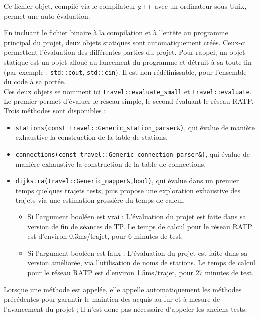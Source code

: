 \documentclass[9pts]{article}
\begin{document}
Ce fichier objet, compilé via le compilateur g++ avec un ordinateur sous Unix, permet une auto-évaluation.

En incluant le fichier binaire à la compilation et à l'entête au programme principal du projet, deux objets statiques sont automatiquement créés. Ceux-ci permettent l'évaluation des différentes parties du projet.
Pour rappel, un objet statique est un objet alloué au lancement du programme et détruit à sa toute fin (par exemple : \texttt{std::cout}, \texttt{std::cin}). Il est non rédéfinissable, pour l'ensemble du code à sa portée.\\

Ces deux objets se nomment ici \texttt{travel::evaluate\_small} et \texttt{travel::evaluate}. Le premier permet d'évaluer le réseau simple, le second évaluant le réseau RATP.\\

Trois méthodes sont disponibles :
\begin{itemize}
  \item \texttt{stations(const travel::Generic\_station\_parser\&)}, qui évalue de manière exhaustive la construction de la table de stations.
  \item \texttt{connections(const travel::Generic\_connection\_parser\&)}, qui évalue de manière exhaustive la construction de la table de connections.
  \item \texttt{dijkstra(travel::Generic\_mapper\&,bool)}, qui évalue dans un premier temps quelques trajets tests, puis propose une exploration exhaustive des trajets via une estimation grossière du temps de calcul.
    \begin{itemize}
      \item Si l'argument booléen est vrai : L'évaluation du projet est faite dans sa version de fin de séances de TP. Le temps de calcul pour le réseau RATP est d'environ 0.3ms/trajet, pour 6 minutes de test.
      \item Si l'argument booléen est faux : L'évaluation du projet est faite dans sa version améliorée, via l'utilisation de noms de stations. Le temps de calcul pour le réseau RATP est d'environ 1.5ms/trajet, pour 27 minutes de test.
    \end{itemize}
\end{itemize}
Lorsque une méthode est appelée, elle appelle automatiquement les méthodes précédentes pour garantir le maintien des acquis au fur et à mesure de l'avancement du projet ; Il n'est donc pas nécessaire d'appeler les anciens tests.\\
\end{document}
